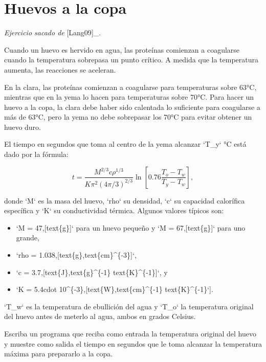 \section{Huevos a la copa}

\emph{Ejercicio sacado de} {[}Lang09{]}\_.

Cuando un huevo es hervido en agua, las proteínas comienzan a coagularse
cuando la temperatura sobrepasa un punto crítico. A medida que la
temperatura aumenta, las reacciones se aceleran.

En la clara, las proteínas comienzan a coagularse para temperaturas
sobre 63°C, mientras que en la yema lo hacen para temperaturas sobre
70°C. Para hacer un huevo a la copa, la clara debe haber sido calentada
lo suficiente para coagularse a más de 63°C, pero la yema no debe
sobrepasar los 70°C para evitar obtener un huevo duro.

El tiempo en segundos que toma al centro de la yema alcanzar `T\_y` °C
está dado por la fórmula:

\[t = \frac{M^{2/3} c \rho^{1/3}}
{K\pi^2(4\pi/3)^{2/3}}
\ln\left[
0.76\frac{T_o - T_w}
{T_y - T_w}
\right],\]

donde `M` es la masa del huevo, `rho` su densidad, `c` su capacidad
calorífica específica y `K` su conductividad térmica. Algunos valores
típicos son:

\begin{itemize}
\item
  `M = 47,{[}text\{g\}{]}` para un huevo pequeño y `M =
  67,{[}text\{g\}{]}` para uno grande,
\item
  `rho = 1.038,{[}text\{g\},text\{cm\}\^{}\{-3\}{]}`,
\item
  `c = 3.7,{[}text\{J\},text\{g\}\^{}\{-1\} text\{K\}\^{}\{-1\}{]}`, y
\item
  `K = 5.4cdot 10\^{}\{-3\},{[}text\{W\},text\{cm\}\^{}\{-1\}
  text\{K\}\^{}\{-1\}`{]}.
\end{itemize}

`T\_w` es la temperatura de ebullición del agua y `T\_o` la temperatura
original del huevo antes de meterlo al agua, ambos en grados Celsius.

Escriba un programa que reciba como entrada la temperatura original del
huevo y muestre como salida el tiempo en segundos que le toma alcanzar
la temperatura máxima para prepararlo a la copa.
